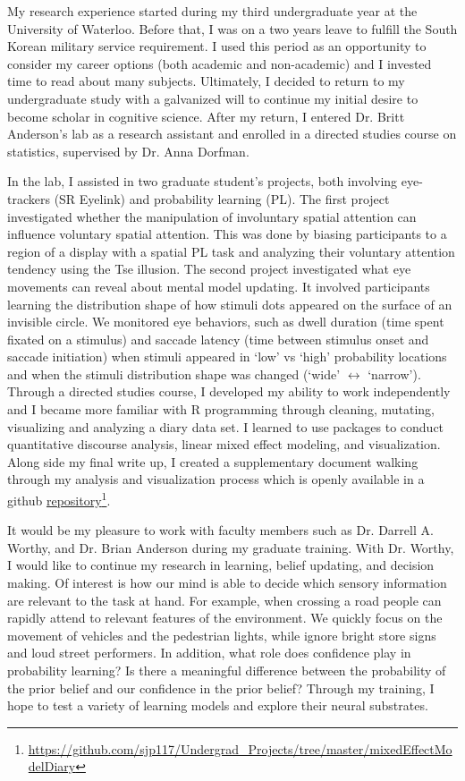 \documentclass[12pt]{article}
\begin{document}
	My research experience started during my third undergraduate year at the University of Waterloo. Before that, I was on a two years leave to fulfill the South Korean military service requirement. I used this period as an opportunity to consider my career options (both academic and non-academic) and I invested time to read about many subjects. Ultimately, I decided to return to my undergraduate study with a galvanized will to continue my initial desire to become scholar in cognitive science. After my return, I entered Dr. Britt Anderson's lab as a research assistant and enrolled in a directed studies course on statistics, supervised by Dr. Anna Dorfman.
	
	In the lab, I assisted in two graduate student's projects, both involving eye-trackers (SR Eyelink) and probability learning (PL). The first project investigated whether the manipulation of involuntary spatial attention can influence voluntary spatial attention. This was done by biasing participants to a region of a display with a spatial PL task and analyzing their voluntary attention tendency using the Tse illusion. The second project investigated what eye movements can reveal about mental model updating. It involved participants learning the distribution shape of how stimuli dots appeared on the surface of an invisible circle. We monitored eye behaviors, such as dwell duration (time spent fixated on a stimulus) and saccade latency (time between stimulus onset and saccade initiation) when stimuli appeared in `low' vs `high' probability locations and when the stimuli distribution shape was changed (`wide' $\leftrightarrow$ `narrow'). Through a directed studies course, I developed my ability to work independently and I became more familiar with R programming through cleaning, mutating, visualizing and analyzing a diary data set. I learned to use packages to conduct quantitative discourse analysis, linear mixed effect modeling, and visualization. Along side my final write up, I created a supplementary document walking through my analysis and visualization process which is openly available in a github \href{https://github.com/sjp117/Undergrad_Projects/tree/master/mixedEffectModelDiary}{repository}\footnote{\url{https://github.com/sjp117/Undergrad\_Projects/tree/master/mixedEffectModelDiary}}.
	
	It would be my pleasure to work with faculty members such as Dr. Darrell A. Worthy, and Dr. Brian Anderson during my graduate training. With Dr. Worthy, I would like to continue my research in learning, belief updating, and decision making. Of interest is how our mind is able to decide which sensory information are relevant to the task at hand. For example, when crossing a road people can rapidly attend to relevant features of the environment. We quickly focus on the movement of vehicles and the pedestrian lights, while ignore bright store signs and loud street performers. In addition, what role does confidence play in probability learning? Is there a meaningful difference between the probability of the prior belief and our confidence in the prior belief? Through my training, I hope to test a variety of learning models and explore their neural substrates.
	
\end{document}
